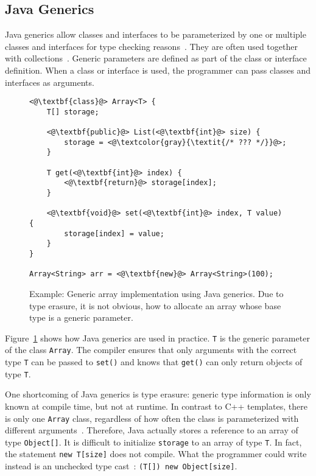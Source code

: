 \subsection{Java Generics}
Java generics allow classes and interfaces to be parameterized by one or multiple classes and interfaces for type checking reasons~\cite{bracha2004generics, Bracha03addinggenerics}. They are often used together with collections~\cite{Parnin:2011:JGA:1985441.1985446}. Generic parameters are defined as part of the class or interface definition. When a class or interface is used, the programmer can pass classes and interfaces as arguments.

\begin{figure}[!htp]
\begin{lstlisting}
<@\textbf{class}@> Array<T> {
    T[] storage;

    <@\textbf{public}@> List(<@\textbf{int}@> size) {
        storage = <@\textcolor{gray}{\textit{/* ??? */}}@>;
    }

    T get(<@\textbf{int}@> index) {
        <@\textbf{return}@> storage[index];
    }

    <@\textbf{void}@> set(<@\textbf{int}@> index, T value) {
        storage[index] = value;
    }
}

Array<String> arr = <@\textbf{new}@> Array<String>(100);
\end{lstlisting}
\caption[Example: Generic array implementation using Java generics]{Example: Generic array implementation using Java generics. Due to type erasure, it is not obvious, how to allocate an array whose base type is a generic parameter.}
\label{fig:rel_java_generics}
\end{figure}

Figure~\ref{fig:rel_java_generics} shows how Java generics are used in practice. \texttt{T} is the generic parameter of the class \texttt{Array}. The compiler ensures that only arguments with the correct type \texttt{T} can be passed to \texttt{set()} and knows that \texttt{get()} can only return objects of type \texttt{T}. 

One shortcoming of Java generics is type erasure: generic type information is only known at compile time, but not at runtime. In contrast to C++ templates, there is only one \texttt{Array} class, regardless of how often the class is parameterized with different arguments~\cite{lembcke2006specialization}. Therefore, Java actually stores a reference to an array of type \texttt{Object[]}. It is difficult to initialize \texttt{storage} to an array of type \texttt{T}. In fact, the statement \texttt{new T[size]} does not compile. What the programmer could write instead is an unchecked type cast~\cite{nino2007cost}: \texttt{(T[]) new Object[size]}.


